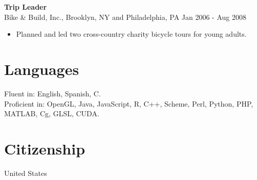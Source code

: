 \documentclass[line,margin]{res}
\begin{document}
\begin{resume}
\textbf{Trip Leader} \\
Bike \& Build, Inc., Brooklyn, NY and Philadelphia, PA \hfill Jan 2006 - Aug 2008
\begin{itemize}  \itemsep -2pt %
\item Planned and led two cross-country charity bicycle tours for young adults.
\end{itemize}





\section{Languages}
Fluent in: English, Spanish, C.\\
Proficient in: OpenGL, Java, JavaScript, R, C++, Scheme, Perl, Python, PHP,\\
\mbox{MATLAB}, Cg, GLSL, CUDA.

\section{Citizenship}
United States

\end{resume}
\end{document}
